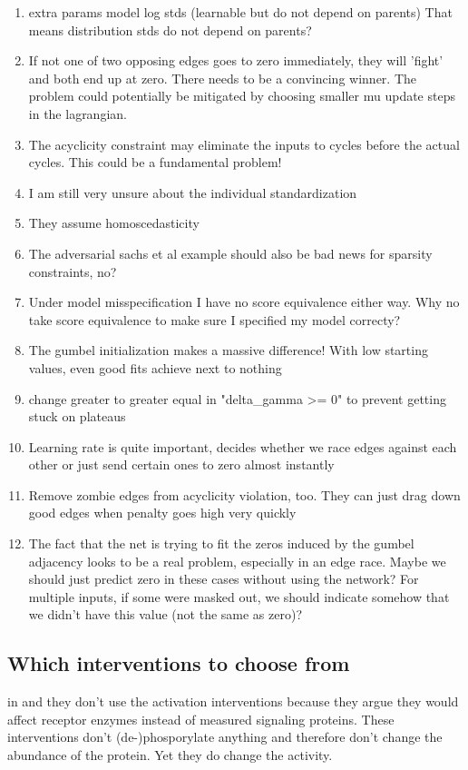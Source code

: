 \documentclass{article}
\begin{document}
\begin{enumerate}
    \item extra params model log stds (learnable but do not depend on parents) That means distribution stds do not depend on parents?
    \item If not one of two opposing edges goes to zero immediately, they will 'fight' and both end up at zero. There needs to be a convincing winner. The problem could potentially be mitigated by choosing smaller mu update steps in the lagrangian.
    \item The acyclicity constraint may eliminate the inputs to cycles before the actual cycles. This could be a fundamental problem!
    \item I am still very unsure about the individual standardization
    \item They assume homoscedasticity
    \item The adversarial sachs et al example should also be bad news for sparsity constraints, no?
    \item Under model misspecification I have no score equivalence either way. Why no take score equivalence to make sure I specified my model correcty?
    \item The gumbel initialization makes a massive difference! With low starting values, even good fits achieve next to nothing
    \item change greater to greater equal in "delta\_gamma >= 0" to prevent getting stuck on plateaus
    \item Learning rate is quite important, decides whether we race edges against each other or just send certain ones to zero almost instantly
    \item Remove zombie edges from acyclicity violation, too. They can just drag down good edges when penalty goes high very quickly
    \item The fact that the net is trying to fit the zeros induced by the gumbel adjacency looks to be a real problem, especially in an edge race. Maybe we should just predict zero in these cases without using the network? For multiple inputs, if some were masked out, we should indicate somehow that we didn't have this value (not the same as zero)?
\end{enumerate}

\subsection{Which interventions to choose from}
in \cite{} and \cite{} they don't use the activation interventions because they argue they would affect receptor enzymes instead of measured signaling proteins. These interventions don't (de-)phosporylate anything and therefore don't change the abundance of the protein. Yet they do change the activity.
\end{document}
